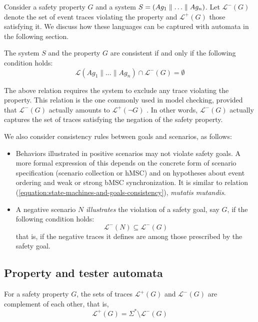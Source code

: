 Consider a safety property $G$ and a system $S = (Ag_1 \parallel \ldots \parallel Ag_n)$. Let $\mathcal{L}^{-}(G)$ denote the set of event traces violating the property and $\mathcal{L}^{+}(G)$ those satisfying it. We discuss how these languages can be captured with automata in the following section.

The system $S$ and the property $G$ are consistent if and only if the following condition holds:
\begin{equation}
\mathcal{L}(Ag_1 \parallel \ldots \parallel Ag_n) \cap \mathcal{L}^{-}(G) = \emptyset
\label{equation:state-machines-and-goals-consistency}
\end{equation}

The above relation requires the system to exclude any trace violating the property. This relation is the one commonly used in model checking, provided that $\mathcal{L}^{-}(G)$ actually amounts to $\mathcal{L}^{+}(\neg G)$ \cite{Clarke:1989}. In other words, $\mathcal{L}^{-}(G)$ actually captures the set of traces satisfying the negation of the safety property.

We also consider consistency rules between goals and scenarios, as follows:
\begin{itemize}
\item Behaviors illustrated in positive scenarios may not violate safety goals. A more formal expression of this depends on the concrete form of scenario specification (scenario collection or hMSC) and on hypotheses about event ordering and weak or strong bMSC synchronization. It is similar to relation (\ref{equation:state-machines-and-goals-consistency}), \emph{mutatis mutandis}.
\item A negative scenario $N$ \emph{illustrates} the violation of a safety goal, say $G$, if the following condition holds:
\begin{equation}
\mathcal{L}^{-}(N) \subseteq \mathcal{L}^{-}(G)
\end{equation}
\noindent that is, if the negative traces it defines are among those prescribed by the safety goal.
\end{itemize}

\subsection{Property and tester automata\label{subsection:background-property-and-tester-automata}}

For a safety property $G$, the sets of traces $\mathcal{L}^{+}(G)$ and $\mathcal{L}^{-}(G)$ are complement of each other, that is,
\begin{equation}
\mathcal{L}^{+}(G) = \Sigma^{*} \setminus \mathcal{L}^{-}(G)
\end{equation}

